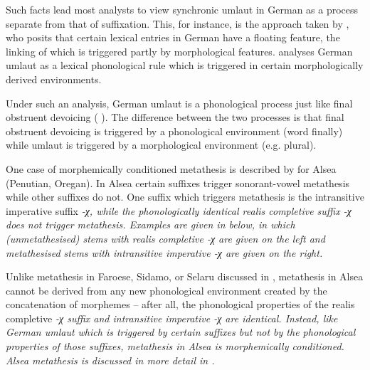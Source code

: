 Such facts lead most analysts to view synchronic umlaut in German
as a process separate from that of suffixation.
This, for instance, is the approach taken by \citet[181ff]{wi96},
who posits that certain lexical entries in German have a floating
\tsc{[+front]} feature, the linking of which is triggered partly by morphological features.
\citet{wi96} analyses German umlaut as a lexical phonological rule
which is triggered in certain morphologically derived environments.

Under such an analysis, German umlaut is a phonological process
just like final obstruent devoicing ( ).
The difference between the two processes is that final 
obstruent devoicing is triggered by a phonological environment (word finally)
while umlaut is triggered by a morphological environment (e.g. plural).

One case of morphemically conditioned metathesis is
described by \citet{bu07} for Alsea (Penutian, Oregan).
In Alsea certain suffixes trigger sonorant-vowel metathesis while other suffixes do not.
One suffix which triggers metathesis is the intransitive imperative suffix \it{-χ},
while the phonologically identical realis completive suffix \it{-χ}
does not trigger metathesis.
Examples are given in  below,
in which (unmetathesised) stems with realis completive \it{-χ}
are given on the left and metathesised stems with
intransitive imperative \it{-χ} are given on the right.

\newpage
\begin{exe}
	\label{ex:AlsMorphemicMet3}
\end{exe}

Unlike metathesis in Faroese, Sidamo, or Selaru discussed
in , metathesis in Alsea cannot be derived
from any new phonological environment created by the concatenation of morphemes
-- after all, the phonological properties of the
realis completive \it{-χ} suffix and intransitive imperative \it{-χ} are identical.
Instead, like German umlaut which is triggered by certain suffixes
but not by the phonological properties of those suffixes,
metathesis in Alsea is morphemically conditioned.
Alsea metathesis is discussed in more detail in .